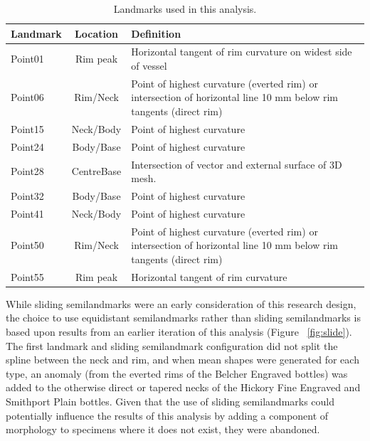 \documentclass[review]{elsarticle}
\begin{document}
\begin{table}[htbp]\centering
\footnotesize
\caption{Landmarks used in this analysis.}
\centering
\begin{tabular}{lcp{7.5cm}}
\toprule
Landmark & Location & Definition\\
\midrule
Point01 & Rim peak & Horizontal tangent of rim curvature on widest side of vessel\\
Point06 & Rim/Neck & Point of highest curvature (everted rim) or intersection of horizontal line 10 mm below rim tangents (direct rim)\\
Point15 & Neck/Body & Point of highest curvature\\
Point24 & Body/Base & Point of highest curvature\\
Point28 & CentreBase & Intersection of vector and external surface of 3D mesh.\\
Point32 & Body/Base & Point of highest curvature\\
Point41 & Neck/Body & Point of highest curvature\\
Point50 & Rim/Neck & Point of highest curvature (everted rim) or intersection of horizontal line 10 mm below rim tangents (direct rim)\\
Point55 & Rim peak & Horizontal tangent of rim curvature\\
\bottomrule
\end{tabular}
\label{tab:Tbl3}
\end{table}

While sliding semilandmarks were an early consideration of this research design, the choice to use equidistant semilandmarks rather than sliding semilandmarks is based upon results from an earlier iteration of this analysis (Figure ~\ref{fig:slide}). The first landmark and sliding semilandmark configuration did not split the spline between the neck and rim, and when mean shapes were generated for each type, an anomaly (from the everted rims of the Belcher Engraved bottles) was added to the otherwise direct or tapered necks of the Hickory Fine Engraved and Smithport Plain bottles. Given that the use of sliding semilandmarks could potentially influence the  results of this analysis by adding a component of morphology to specimens where it does not exist, they were abandoned.
\end{document}

